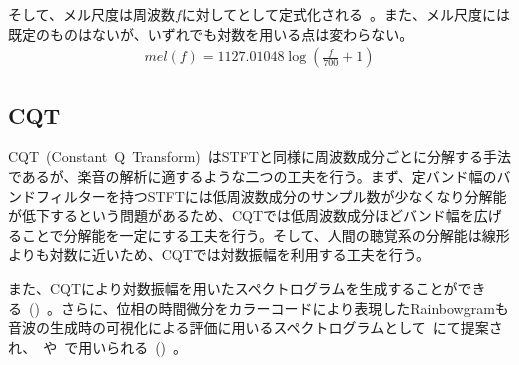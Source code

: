 そして、メル尺度は周波数$f$に対してとして定式化される~\cite{mel}。また、メル尺度には既定のものはないが、いずれでも対数を用いる点は変わらない。
\begin{align}
    \label{eq:mel}
    mel(f)=1127.01048\log{(\frac{f}{700}+1)}
\end{align}

\subsection{CQT}

CQT~(Constant~Q~Transform)~\cite{CQT}はSTFTと同様に周波数成分ごとに分解する手法であるが、楽音の解析に適するような二つの工夫を行う。まず、定バンド幅のバンドフィルターを持つSTFTには低周波数成分のサンプル数が少なくなり分解能が低下するという問題があるため、CQTでは低周波数成分ほどバンド幅を広げることで分解能を一定にする工夫を行う。そして、人間の聴覚系の分解能は線形よりも対数に近いため、CQTでは対数振幅を利用する工夫を行う。

また、CQTにより対数振幅を用いたスペクトログラムを生成することができる~()~。さらに、位相の時間微分をカラーコードにより表現したRainbowgramも音波の生成時の可視化による評価に用いるスペクトログラムとして~\cite{NSynth}にて提案され、~\cite{GANSynth}や~\cite{timbretron}で用いられる~()~。

